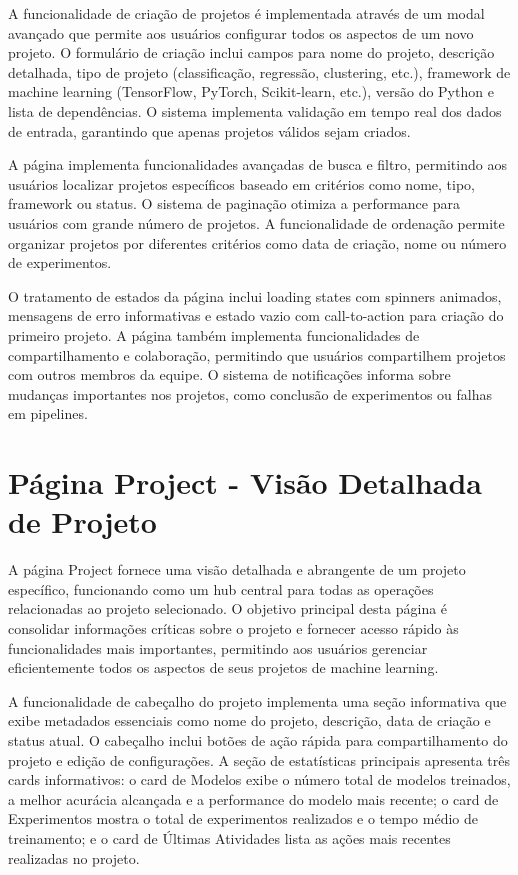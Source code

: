 \documentclass[12pt,a4paper]{article}
\begin{document}
A funcionalidade de criação de projetos é implementada através de um modal avançado que permite aos usuários configurar todos os aspectos de um novo projeto. O formulário de criação inclui campos para nome do projeto, descrição detalhada, tipo de projeto (classificação, regressão, clustering, etc.), framework de machine learning (TensorFlow, PyTorch, Scikit-learn, etc.), versão do Python e lista de dependências. O sistema implementa validação em tempo real dos dados de entrada, garantindo que apenas projetos válidos sejam criados.

A página implementa funcionalidades avançadas de busca e filtro, permitindo aos usuários localizar projetos específicos baseado em critérios como nome, tipo, framework ou status. O sistema de paginação otimiza a performance para usuários com grande número de projetos. A funcionalidade de ordenação permite organizar projetos por diferentes critérios como data de criação, nome ou número de experimentos.

O tratamento de estados da página inclui loading states com spinners animados, mensagens de erro informativas e estado vazio com call-to-action para criação do primeiro projeto. A página também implementa funcionalidades de compartilhamento e colaboração, permitindo que usuários compartilhem projetos com outros membros da equipe. O sistema de notificações informa sobre mudanças importantes nos projetos, como conclusão de experimentos ou falhas em pipelines.

\section{Página Project - Visão Detalhada de Projeto}

A página Project fornece uma visão detalhada e abrangente de um projeto específico, funcionando como um hub central para todas as operações relacionadas ao projeto selecionado. O objetivo principal desta página é consolidar informações críticas sobre o projeto e fornecer acesso rápido às funcionalidades mais importantes, permitindo aos usuários gerenciar eficientemente todos os aspectos de seus projetos de machine learning.

A funcionalidade de cabeçalho do projeto implementa uma seção informativa que exibe metadados essenciais como nome do projeto, descrição, data de criação e status atual. O cabeçalho inclui botões de ação rápida para compartilhamento do projeto e edição de configurações. A seção de estatísticas principais apresenta três cards informativos: o card de Modelos exibe o número total de modelos treinados, a melhor acurácia alcançada e a performance do modelo mais recente; o card de Experimentos mostra o total de experimentos realizados e o tempo médio de treinamento; e o card de Últimas Atividades lista as ações mais recentes realizadas no projeto.
\end{document}

